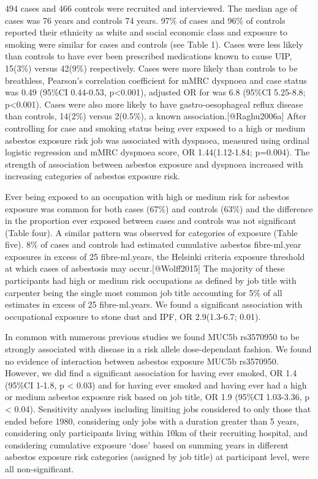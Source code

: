 \documentclass[
]{article}
\begin{document}
494 cases and 466 controls were recruited and interviewed. The median
age of cases was 76 years and controls 74 years. 97\% of cases and 96\%
of controls reported their ethnicity as white and social economic class
and exposure to smoking were similar for cases and controls (see Table
1). Cases were less likely than controls to have ever been prescribed
medications known to cause UIP, 15(3\%) versus 42(9\%) respectively.
Cases were more likely than controls to be breathless, Pearson's
correlation coefficient for mMRC dyspnoea and case status was 0.49
(95\%CI 0.44-0.53, p\textless0.001), adjusted OR for was 6.8 (95\%CI
5.25-8.8; p\textless0.001). Cases were also more likely to have
gastro-oesophageal reflux disease than controls, 14(2\%) versus
2(0.5\%), a known association.{[}@Raghu2006a{]} After controlling for
case and smoking status being ever exposed to a high or medium asbestos
exposure risk job was associated with dyspnoea, measured using ordinal
logistic regression and mMRC dyspnoea score, OR 1.44(1.12-1.84;
p=0.004). The strength of association between asbestos exposure and
dyspnoea increased with increasing categories of asbestos exposure risk.

Ever being exposed to an occupation with high or medium risk for
asbestos exposure was common for both cases (67\%) and controls (63\%)
and the difference in the proportion ever exposed between cases and
controls was not significant (Table four). A similar pattern was
observed for categories of exposure (Table five). 8\% of cases and
controls had estimated cumulative asbestos fibre-ml.year exposures in
excess of 25 fibre-ml.years, the Helsinki criteria exposure threshold at
which cases of asbestosis may occur.{[}@Wolff2015{]} The majority of
these participants had high or medium risk occupations as defined by job
title with carpenter being the single most common job title accounting
for 5\% of all estimates in excess of 25 fibre-ml.years. We found a
significant association with occupational exposure to stone dust and
IPF, OR 2.9(1.3-6.7; 0.01).

In common with numerous previous studies we found MUC5b rs3570950 to be
strongly associated with disease in a risk allele dose-dependant
fashion. We found no evidence of interaction between asbestos exposure
MUC5b rs3570950. However, we did find a significant association for
having ever smoked, OR 1.4 (95\%CI 1-1.8, p \textless{} 0.03) and for
having ever smoked and having ever had a high or medium asbestos
exposure risk based on job title, OR 1.9 (95\%CI 1.03-3.36, p
\textless{} 0.04). Sensitivity analyses including limiting jobs
considered to only those that ended before 1980, considering only jobs
with a duration greater than 5 years, considering only participants
living within 10km of their recruiting hospital, and considering
cumulative exposure `dose' based on summing years in different asbestos
exposure risk categories (assigned by job title) at participant level,
were all non-significant.
\end{document}
